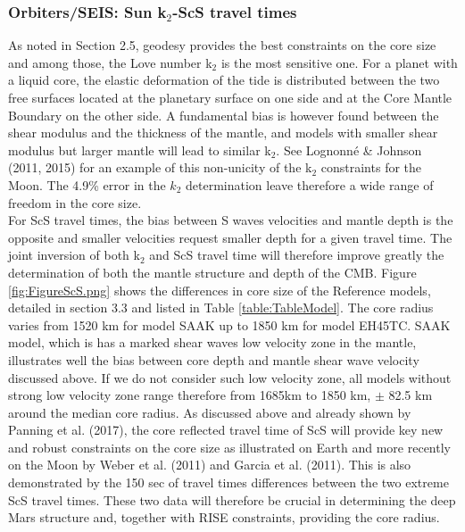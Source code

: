 \subsubsection{Orbiters/SEIS: Sun k$_2$-ScS travel times}
As noted in Section 2.5, geodesy provides the best constraints on the core size and among those, the Love number k$_2$ is the most sensitive one. For a planet with a liquid core, the elastic deformation of the tide is distributed between the two free surfaces located at the planetary surface on one side and at the Core Mantle Boundary on the other side. A fundamental bias is however found between the shear modulus and the thickness of the mantle, and models with smaller shear modulus but larger mantle will lead to similar k$_2$. See Lognonn\'e \& Johnson (2011, 2015) for an example of this non-unicity of the k$_2$ constraints for the Moon. The 4.9\% error in the $k_2$ determination leave therefore a wide range of freedom in the core size.\\
For ScS travel times, the bias between S waves velocities and mantle depth is the opposite and smaller velocities request smaller depth for a given travel time. The joint inversion of both k$_2$ and ScS travel time will therefore improve greatly the determination of both the mantle structure and depth of the CMB.
Figure \ref{fig:FigureScS.png} shows the differences in core size of the Reference models, detailed in section 3.3 and listed in Table \ref{table:TableModel}. The core radius varies from 1520 km for model SAAK up to 1850 km for model EH45TC. SAAK model, which is has a marked shear waves low velocity zone in the mantle, illustrates well the bias between core depth and mantle shear wave velocity discussed above. If we do not consider such low velocity zone, all models without strong low velocity zone range therefore from 1685km to 1850 km, $\pm$ 82.5 km around the median core radius. As discussed above and already shown by Panning et al. (2017), the core reflected travel time of ScS will provide key new and robust constraints on the core size as illustrated on Earth and more recently on the Moon by Weber et al. (2011) and Garcia et al. (2011). This is also demonstrated by the 150 sec of travel times differences between the two extreme ScS travel times. These two data will therefore be crucial in determining the deep Mars structure and, together with RISE constraints, providing the core radius.
